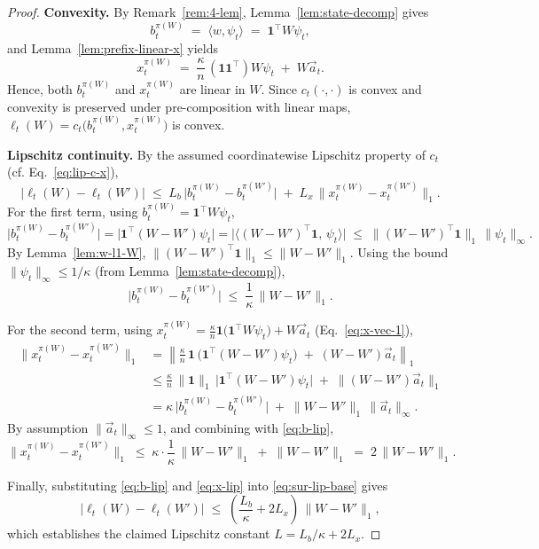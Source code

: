 \documentclass[11pt]{article}
\begin{document}
\begin{proof}
\textbf{Convexity.}
By Remark~\ref{rem:4-lem}, Lemma~\ref{lem:state-decomp} gives
\[
b_t^{\pi(W)} \;=\; \langle w,\psi_t\rangle \;=\; \mathbf{1}^\top W \psi_t,
\]
and Lemma~\ref{lem:prefix-linear-x} yields
\[
x_t^{\pi(W)} 
\;=\;
\frac{\kappa}{n}\,(\mathbf{1}\mathbf{1}^\top)W\psi_t \;+\; W\vec{a}_t.
\]
Hence, both \(b_t^{\pi(W)}\) and \(x_t^{\pi(W)}\) are linear in \(W\). Since \(c_t(\cdot,\cdot)\) is convex and convexity is preserved under pre-composition with linear maps, \(\ell_t(W)=c_t\!\bigl(b_t^{\pi(W)},x_t^{\pi(W)}\bigr)\) is convex.

\medskip
\textbf{Lipschitz continuity.}
By the assumed coordinatewise Lipschitz property of \(c_t\) (cf. Eq.~\ref{eq:lip-c-x}),
\begin{equation}\label{eq:sur-lip-base}
\bigl|\ell_t(W)-\ell_t(W')\bigr|
\;\le\;
L_b\,\bigl|b_t^{\pi(W)}-b_t^{\pi(W')}\bigr|
\;+\;
L_x\,\bigl\|x_t^{\pi(W)}-x_t^{\pi(W')}\bigr\|_1.
\end{equation}
For the first term, using \(b_t^{\pi(W)}=\mathbf{1}^\top W\psi_t\),
\[
\bigl|b_t^{\pi(W)}-b_t^{\pi(W')}\bigr|
=
\bigl|\mathbf{1}^\top (W-W')\psi_t\bigr|
=
\bigl|\langle (W-W')^\top\mathbf{1},\,\psi_t\rangle\bigr|
\;\le\;
\|(W-W')^\top\mathbf{1}\|_1\,\|\psi_t\|_\infty.
\]
By Lemma~\ref{lem:w-l1-W}, \(\|(W-W')^\top\mathbf{1}\|_1\le \|W-W'\|_1\). Using the bound \(\|\psi_t\|_\infty\le 1/\kappa\) (from Lemma~\ref{lem:state-decomp}),
\begin{equation}\label{eq:b-lip}
\bigl|b_t^{\pi(W)}-b_t^{\pi(W')}\bigr|
\;\le\;
\frac{1}{\kappa}\,\|W-W'\|_1.
\end{equation}

For the second term, using \(x_t^{\pi(W)}=\frac{\kappa}{n}\mathbf{1}\bigl(\mathbf{1}^\top W\psi_t\bigr)+W\vec{a}_t\) (Eq.~\ref{eq:x-vec-1}),
\begin{align*}
\bigl\|x_t^{\pi(W)}-x_t^{\pi(W')}\bigr\|_1
&=
\left\|\frac{\kappa}{n}\,\mathbf{1}\,\bigl(\mathbf{1}^\top (W-W')\psi_t\bigr)
\;+\;
(W-W')\vec{a}_t\right\|_1 \\
&\le
\frac{\kappa}{n}\,\|\mathbf{1}\|_1\,\bigl|\mathbf{1}^\top (W-W')\psi_t\bigr|
\;+\;
\|(W-W')\vec{a}_t\|_1 \\
&=
\kappa\,\bigl|b_t^{\pi(W)}-b_t^{\pi(W')}\bigr|
\;+\;
\|W-W'\|_1\,\|\vec{a}_t\|_\infty.
\end{align*}
By assumption \(\|\vec{a}_t\|_\infty\le 1\), and combining with \eqref{eq:b-lip},
\begin{equation}\label{eq:x-lip}
\bigl\|x_t^{\pi(W)}-x_t^{\pi(W')}\bigr\|_1
\;\le\;
\kappa\cdot \frac{1}{\kappa}\,\|W-W'\|_1 \;+\; \|W-W'\|_1
\;=\;
2\,\|W-W'\|_1.
\end{equation}

Finally, substituting \eqref{eq:b-lip} and \eqref{eq:x-lip} into \eqref{eq:sur-lip-base} gives
\[
\bigl|\ell_t(W)-\ell_t(W')\bigr|
\;\le\;
\left(\frac{L_b}{\kappa}+2L_x\right)\,\|W-W'\|_1,
\]
which establishes the claimed Lipschitz constant \(L=L_b/\kappa+2L_x\).
\end{proof}
\end{document}

